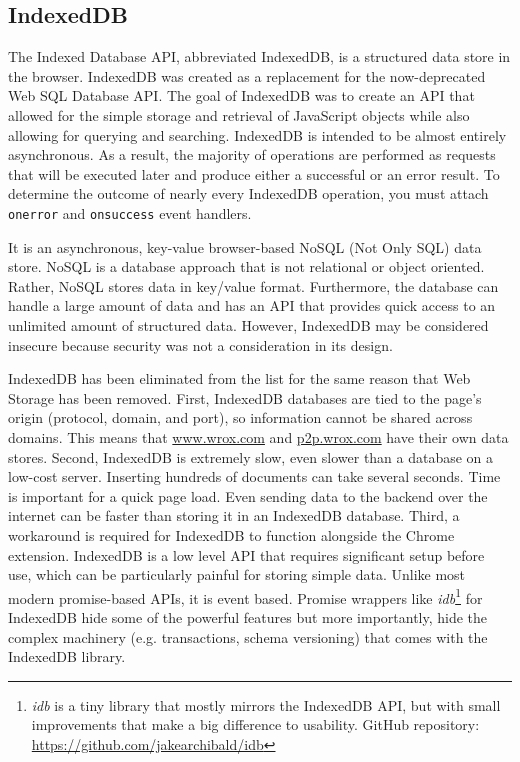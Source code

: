 \subsection*{IndexedDB}
The Indexed Database API, abbreviated IndexedDB, is a structured data store in the browser. IndexedDB was created as a replacement for the now-deprecated Web SQL Database API. The goal of IndexedDB was to create an API that allowed for the simple storage and retrieval of JavaScript objects while also allowing for querying and searching. IndexedDB is intended to be almost entirely asynchronous. As a result, the majority of operations are performed as requests that will be executed later and produce either a successful or an error result. To determine the outcome of nearly every IndexedDB operation, you must attach \texttt{onerror} and \texttt{onsuccess} event handlers.

It is an asynchronous, key-value browser-based NoSQL (Not Only SQL) data store. NoSQL is a database approach that is not relational or object oriented. Rather, NoSQL stores data in key/value format. Furthermore, the database can handle a large amount of data and has an API that provides quick access to an unlimited amount of structured data. However, IndexedDB may be considered insecure because security was not a consideration in its design.

IndexedDB has been eliminated from the list for the same reason that Web Storage has been removed. First, IndexedDB databases are tied to the page's origin (protocol, domain, and port), so information cannot be shared across domains. This means that \url{www.wrox.com} and \url{p2p.wrox.com} have their own data stores. Second, IndexedDB is extremely slow, even slower than a database on a low-cost server. Inserting hundreds of documents can take several seconds. Time is important for a quick page load. Even sending data to the backend over the internet can be faster than storing it in an IndexedDB database. Third, a workaround is required for IndexedDB to function alongside the Chrome extension. IndexedDB is a low level API that requires significant setup before use, which can be particularly painful for storing simple data. Unlike most modern promise-based APIs, it is event based. Promise wrappers like \emph{idb}\footnote{\emph{idb} is a tiny library that mostly mirrors the IndexedDB API, but with small improvements that make a big difference to usability. GitHub repository: \url{https://github.com/jakearchibald/idb}} for IndexedDB hide some of the powerful features but more importantly, hide the complex machinery (e.g. transactions, schema versioning) that comes with the IndexedDB library.

